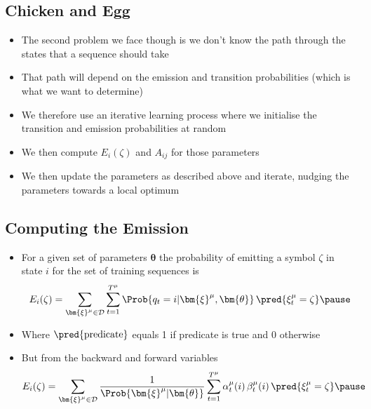 
\begin{slide}
\section{Chicken and Egg}

\begin{PauseHighLight}
  \begin{itemize}
  \item The second problem we face though is we don't know the path through the
    states that a sequence should take\pause
  \item That path will depend on the emission and transition
    probabilities (which is what we want to determine)\pause
  \item We therefore use an iterative learning process where we
    initialise the transition and emission probabilities at random\pause
  \item We then compute $E_i(\zeta)$ and $A_{ij}$ for those
    parameters\pause
  \item We then update the parameters as described above and iterate,
    nudging the parameters towards a local optimum\pause
  \end{itemize}
\end{PauseHighLight}

\end{slide}


\begin{slide}
\section[-1]{Computing the Emission}

\begin{PauseHighLight}
  \begin{itemize}
  \item For a given set of parameters $\bm{\theta}$ the probability of
    emitting a symbol $\zeta$ in state $i$ for the set of training
    sequences is
    \begin{align*}
      E_i(\zeta) = \sum_{\bm{\xi}^\mu\in\mathcal{D}} \sum_{t=1}^{T^\mu}
      \Prob{q_t=i| \bm{\xi}^\mu, \bm{\theta}} \, \pred{\xi_t^\mu = \zeta}\pause
    \end{align*}
  \item Where $\pred{\text{predicate}}$ equals 1 if predicate is true
    and 0 otherwise\pause
  \item But from the backward and forward variables
    \begin{align*}
      E_i(\zeta) = \sum_{\bm{\xi}^\mu\in\mathcal{D}} 
      \frac{1}{\Prob{\bm{\xi}^\mu|\bm{\theta}}}\sum_{t=1}^{T^\mu}
      \alpha_t^\mu(i)\,\beta_t^\mu(i)\, \pred{\xi_t^\mu = \zeta}\pause
    \end{align*}
  \end{itemize}
\end{PauseHighLight}

\end{slide}


